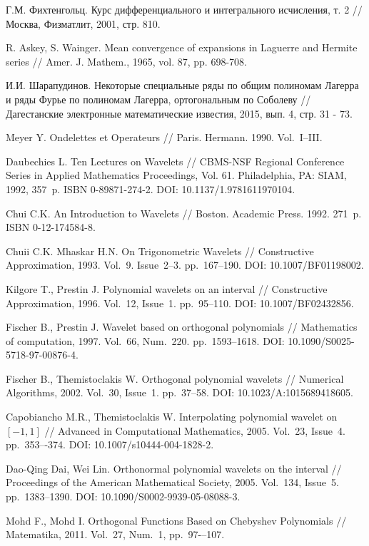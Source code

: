\begin{thebibliography}{1}
 Г.М. Фихтенгольц. Курс дифференциального и интегрального исчисления, т. 2 // Москва, Физматлит, 2001, стр. 810.


 R. Askey, S. Wainger. Mean convergence of expansions in Laguerre and Hermite series // Amer. J. Mathem., 1965, vol. 87, pp. 698-708.


 И.И. Шарапудинов. Некоторые специальные ряды по общим полиномам Лагерра и ряды Фурье по полиномам Лагерра, ортогональным по Соболеву // Дагестанские электронные математические известия, 2015, вып. 4, стр. 31 - 73.

 Meyer Y. Ondelettes et Operateurs // Paris. Hermann. 1990. Vol.~I–III.

 Daubechies L. Ten Lectures on Wavelets // CBMS-NSF Regional Conference Series in Applied Mathematics Proceedings,
Vol. 61. Philadelphia, PA: SIAM, 1992, 357~p. ISBN 0-89871-274-2. DOI: 10.1137/1.9781611970104.

 Chui C.K. An Introduction to  Wavelets // Boston. Academic Press. 1992. 271~p. ISBN 0-12-174584-8.

 Chuii C.K. Mhaskar H.N. On Trigonometric Wavelets // Constructive Approximation, 1993. Vol.~9. Issue~2--3. pp.~167--190. DOI: 10.1007/BF01198002.

 Kilgore T., Prestin J. Polynomial wavelets on an interval // Constructive Approximation, 1996. Vol.~12, Issue~1. pp.~95--110. DOI: 10.1007/BF02432856.

 Fischer B., Prestin J. Wavelet based on orthogonal polynomials // Mathematics of computation, 1997. Vol.~66, Num.~220. pp.~1593--1618. DOI: 10.1090/S0025-5718-97-00876-4.

 Fischer B., Themistoclakis W. Orthogonal polynomial wavelets // Numerical Algorithms, 2002. Vol.~30, Issue~1. pp.~37--58. DOI: 10.1023/A:1015689418605.

 Capobiancho M.R., Themistoclakis W. Interpolating polynomial wavelet on $[-1,1]$ // Advanced in Computational Mathematics, 2005. Vol.~23, Issue~4. pp.~353–-374. DOI: 10.1007/s10444-004-1828-2.

 Dao-Qing Dai, Wei Lin. Orthonormal polynomial wavelets on the interval // Proceedings of the American Mathematical Society, 2005. Vol.~134, Issue~5. pp.~1383–1390. DOI: 10.1090/S0002-9939-05-08088-3.

 Mohd F., Mohd I. Orthogonal Functions Based on Chebyshev Polynomials // Matematika, 2011. Vol.~27, Num.~1, pp.~97-–107.


\end{thebibliography}
